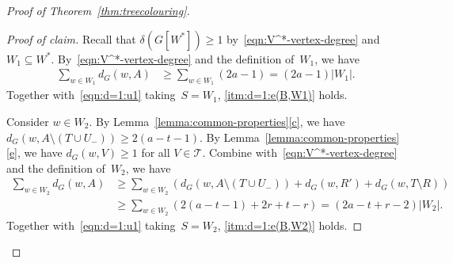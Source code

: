 \documentclass[11pt]{article}
\newenvironment{proofclaim}[1][Proof of claim]{\begin{proof}[#1]\renewcommand*{\qedsymbol}{\(\blacksquare\)}}{\end{proof}}
\theoremstyle{plain}
\numberwithin{equation}{section}
\begin{document}
\begin{proof}[Proof of Theorem~\ref{thm:treecolouring}]
\begin{proofclaim}
Recall that $\delta(G[W^*]) \ge 1$ by~\eqref{eqn:V^*-vertex-degree} and $W_1 \subseteq W^*$.
By~\eqref{eqn:V^*-vertex-degree} and the definition of~$W_1$, we have
\begin{align*}
	\sum_{w \in W_1} d_G(w,A) & \ge \sum_{w \in W_1} \left( 2a - 1 \right)=\left( 2a - 1 \right) |W_1|.
\end{align*}
Together with~\eqref{eqn:d=1:u1} taking~$S=W_1$, \ref{itm:d=1:e(B,W1)} holds.

Consider $w \in W_2$.
By Lemma~\ref{lemma:common-properties}\ref{c}, we have $d_G(w,A \setminus (T \cup U_-)) \ge 2(a-t-1)$. By Lemma~\ref{lemma:common-properties}\ref{e}, we have $d_G(w,V) \ge 1$ for all $V \in \mathcal{T}$. Combine with~\eqref{eqn:V^*-vertex-degree} and the definition of~$W_2$, we have
\begin{align*}
	\sum_{w \in W_2} d_G(w,A) & \ge \sum_{w \in W_2} \left( d_G(w,A \setminus (T \cup U_-)) + d_G(w,R') +d_G(w, T \setminus R ) \right) \\
	& \ge \sum_{w \in W_2} \left( 2(a-t-1)  + 2r 	+  t-r\right)  = ( 2a -t + r -2 ) |W_2|.
\end{align*}
Together with~\eqref{eqn:d=1:u1} taking~$S=W_2$, \ref{itm:d=1:e(B,W2)} holds.


\end{proofclaim}
\end{proof}
\end{document}
